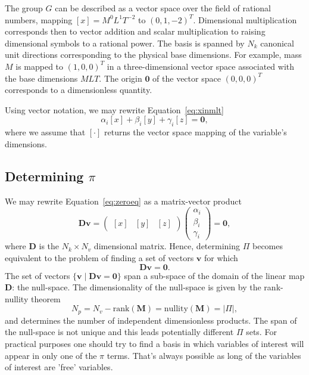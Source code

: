 \documentclass[11pt]{article}
\begin{document}
The group $G$ can be described as a vector space over the field of rational numbers, mapping $[x] = M^0L^1T^{-2}$ to $(0,1,-2)^T$. Dimensional multiplication corresponds then to vector addition and scalar multiplication to raising dimensional symbols to a rational power. The basis is spanned by $N_k$ canonical unit directions corresponding to the physical base dimensions. For example, mass $M$ is mapped to $(1,0,0)^T$ in a three-dimensional vector space associated with the base dimensions $MLT$. The origin $\mathbf{0}$ of the vector space $(0,0,0)^T$ corresponds to a dimensionless quantity.

Using vector notation, we may rewrite Equation~\ref{eq:xinmlt}
\begin{equation}
    \alpha_i[x] + \beta_i[y] + \gamma_i[z] = \mathbf{0}, \label{eq:zeroeq}
\end{equation}
where we assume that $\left[\cdot\right]$ returns the vector space mapping of the variable's dimensions. 

\subsection{Determining $\pi$}

We may rewrite Equation~\ref{eq:zeroeq} as a matrix-vector product
\begin{equation}
    \mathbf{D}\mathbf{v} =\begin{pmatrix}[x] & [y] & [z]\end{pmatrix}\begin{pmatrix} \alpha_i \\ \beta_i \\ \gamma_i\end{pmatrix} = \mathbf{0},
\end{equation}
where $\mathbf{D}$ is the $N_k \times N_v$ dimensional matrix. Hence, determining $\Pi$ becomes equivalent to the problem of finding a set of vectors $\mathbf{v}$ for which
\begin{equation}
    \mathbf{D}\mathbf{v}=\mathbf{0}.
\end{equation}
The set of vectors $\{\mathbf{v} \mid \mathbf{D}\mathbf{v}=\mathbf{0}\}$ span a sub-space of the domain of the linear map $\mathbf{D}$: the null-space. The dimensionality of the null-space is given by the rank-nullity theorem
\begin{equation}
    N_p = N_v - \text{rank}(\mathbf{M}) = \text{nullity}(\mathbf{M}) = |\Pi|,
\end{equation}
and determines the number of independent dimensionless products. The span of the null-space is not unique and this leads potentially different $\Pi$ sets. For practical purposes one should try to find a basis in which variables of interest will appear in only one of the $\pi$ terms. That's always possible as long of the variables of interest are 'free' variables. 
\end{document}
